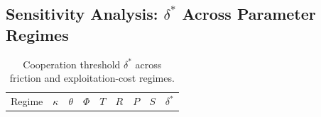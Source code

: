 \documentclass[11pt]{article}
\theoremstyle{plain}
\theoremstyle{definition}
\theoremstyle{remark}
\let\origsubsection\subsection
\renewcommand{\subsection}{\needspace{7\baselineskip}\origsubsection}
\begin{document}
\subsection{\texorpdfstring{Sensitivity Analysis: \(\delta^*\) Across
Parameter
Regimes}{Sensitivity Analysis: \textbackslash delta\^{}* Across Parameter Regimes}}\label{sensitivity-analysis-delta-star}

\begin{longtable}[]{@{}
  >{\raggedright\arraybackslash}p{}
  >{\raggedright\arraybackslash}p{}
  >{\raggedright\arraybackslash}p{}
  >{\raggedright\arraybackslash}p{}
  >{\raggedright\arraybackslash}p{}
  >{\raggedright\arraybackslash}p{}
  >{\raggedright\arraybackslash}p{}
  >{\raggedright\arraybackslash}p{}
  >{\raggedright\arraybackslash}p{}@{}}
\caption{Cooperation threshold \(\delta^*\) across friction and
exploitation-cost regimes.}\tabularnewline
\toprule\noalign{}
\begin{minipage}[b]{\linewidth}\raggedright
Regime
\end{minipage} & \begin{minipage}[b]{\linewidth}\raggedright
\(\kappa\)
\end{minipage} & \begin{minipage}[b]{\linewidth}\raggedright
\(\theta\)
\end{minipage} & \begin{minipage}[b]{\linewidth}\raggedright
\(\Phi\)
\end{minipage} & \begin{minipage}[b]{\linewidth}\raggedright
\(T\)
\end{minipage} & \begin{minipage}[b]{\linewidth}\raggedright
\(R\)
\end{minipage} & \begin{minipage}[b]{\linewidth}\raggedright
\(P\)
\end{minipage} & \begin{minipage}[b]{\linewidth}\raggedright
\(S\)
\end{minipage} & \begin{minipage}[b]{\linewidth}\raggedright
\(\delta^*\)
\end{minipage} \\

\end{longtable}
\end{document}
